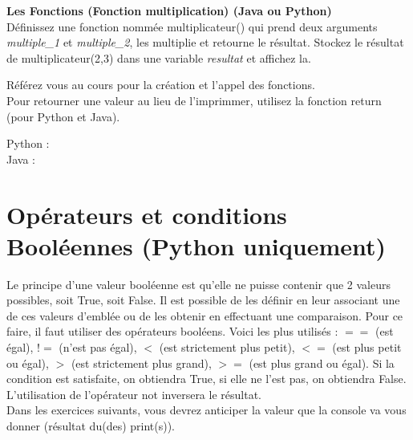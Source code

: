 \begin{Exercice}[5 minutes] \textbf{Les Fonctions (Fonction multiplication) (Java ou Python)}\\
   Définissez une fonction nommée multiplicateur() qui prend deux arguments \textit{multiple\_1} et \textit{multiple\_2}, les multiplie et retourne le résultat. Stockez le résultat de multiplicateur(2,3) dans une variable \textit{resultat} et affichez la.   \\
   
    \begin{conseil}
      	Référez vous au cours pour la création et l'appel des fonctions. \\
      	
      	Pour retourner une valeur au lieu de l'imprimmer, utilisez la fonction return (pour Python et Java).
        
    \end{conseil}
    \begin{solution}
    
    Python : \\
    
    
    
    Java : \\
    
    
           
    \end{solution}   
\end{Exercice}

\newpage
\section{Opérateurs et conditions Booléennes (Python uniquement)}
Le principe d'une valeur booléenne est qu'elle ne puisse contenir que 2 valeurs possibles, soit True, soit False. Il est possible de les définir en leur associant une de ces valeurs d'emblée ou de les obtenir en effectuant une comparaison. Pour ce faire, il faut utiliser des opérateurs booléens. Voici les plus utilisés : $==$ (est égal), $!=$ (n'est pas égal), $<$ (est strictement plus petit), $<=$ (est plus petit ou égal), $>$ (est strictement plus grand), $>=$ (est plus grand ou égal). Si la condition est satisfaite, on obtiendra True, si elle ne l'est pas, on obtiendra False. L'utilisation de l'opérateur not inversera le résultat.\\

Dans les exercices suivants, vous devrez anticiper la valeur que la console va vous donner (résultat du(des) print(s)). \\

